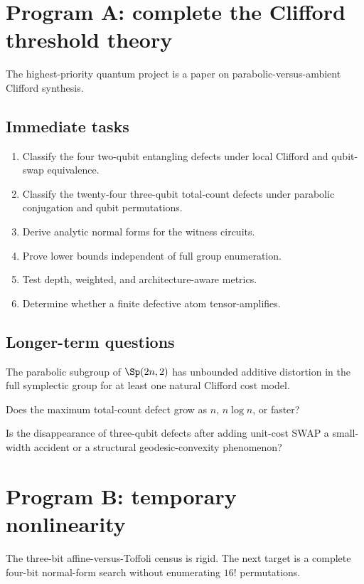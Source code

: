 \section{Program A: complete the Clifford threshold theory}
The highest-priority quantum project is a paper on parabolic-versus-ambient Clifford synthesis.

\subsection{Immediate tasks}
\begin{enumerate}
\item Classify the four two-qubit entangling defects under local Clifford and qubit-swap equivalence.
\item Classify the twenty-four three-qubit total-count defects under parabolic conjugation and qubit permutations.
\item Derive analytic normal forms for the witness circuits.
\item Prove lower bounds independent of full group enumeration.
\item Test depth, weighted, and architecture-aware metrics.
\item Determine whether a finite defective atom tensor-amplifies.
\end{enumerate}

\subsection{Longer-term questions}
\begin{conjecture}
The parabolic subgroup of $\Sp(2n,2)$ has unbounded additive distortion in the full symplectic group for at least one natural Clifford cost model.
\end{conjecture}
\begin{question}
Does the maximum total-count defect grow as $n$, $n\log n$, or faster?
\end{question}
\begin{question}
Is the disappearance of three-qubit defects after adding unit-cost SWAP a small-width accident or a structural geodesic-convexity phenomenon?
\end{question}

\section{Program B: temporary nonlinearity}
The three-bit affine-versus-Toffoli census is rigid.  The next target is a complete four-bit normal-form search without enumerating $16!$ permutations.


